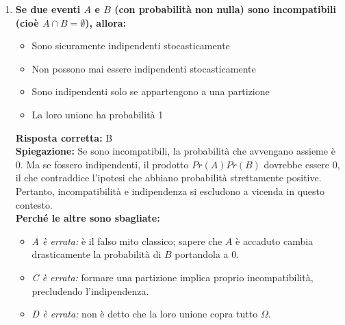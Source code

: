 \documentclass[12pt, a4paper]{article}
\begin{document}
\begin{enumerate}[label=\textbf{\arabic*.}]
    \item \textbf{Se due eventi $A$ e $B$ (con probabilità non nulla) sono incompatibili (cioè $A \cap B = \emptyset$), allora:}
    \begin{itemize}
        \item[A)] Sono sicuramente indipendenti stocasticamente
        \item[B)] Non possono mai essere indipendenti stocasticamente
        \item[C)] Sono indipendenti solo se appartengono a una partizione
        \item[D)] La loro unione ha probabilità 1
    \end{itemize}
    \textbf{Risposta corretta:} B \\
    \textbf{Spiegazione:} Se sono incompatibili, la probabilità che avvengano assieme è 0. Ma se fossero indipendenti, il prodotto $Pr(A)Pr(B)$ dovrebbe essere 0, il che contraddice l'ipotesi che abbiano probabilità strettamente positive. Pertanto, incompatibilità e indipendenza si escludono a vicenda in questo contesto. \\
    \textbf{Perché le altre sono sbagliate:}
    \begin{itemize}
        \item \textit{A è errata:} è il falso mito classico; sapere che $A$ è accaduto cambia drasticamente la probabilità di $B$ portandola a 0.
        \item \textit{C è errata:} formare una partizione implica proprio incompatibilità, precludendo l'indipendenza.
        \item \textit{D è errata:} non è detto che la loro unione copra tutto $\Omega$.
    \end{itemize}


\end{enumerate}
\end{document}
